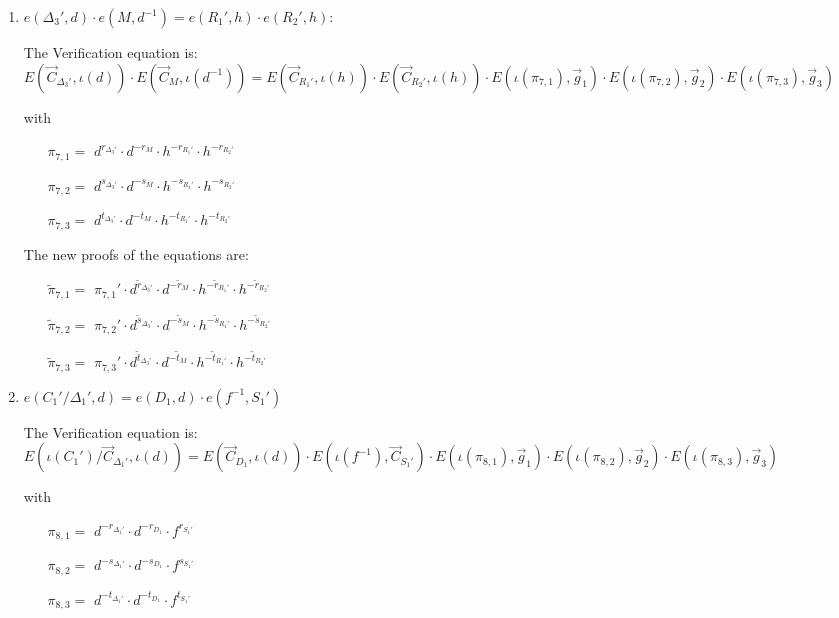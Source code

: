 \begin{description}
\begin{enumerate}
  \item $e(\boxed{\Delta_3'},d) \cdot e(\boxed{M}, d^{-1})= e(\boxed{R_1'}, h) \cdot e(\boxed{R_2'}, h)$:
    
    The Verification equation is:  $E(\vec{C}_{\Delta_3'}, \iota(d)) \cdot E(\vec{C}_M, \iota(d^{-1}))= E(\vec{C}_{R_1'}, \iota(h)) \cdot E(\vec{C}_{R_2'}, \iota(h)) \cdot E(\iota(\pi_{7,1}), \vec{g}_1)\cdot E(\iota(\pi_{7,2}), \vec{g}_2)\cdot E(\iota(\pi_{7,3}), \vec{g}_3)$
    
    with
    \begin{itemize}
    \item[$\pi_{7,1} = $] $d^{r_{\Delta_3'}} \cdot d^{-r_M} \cdot h^{-r_{R_1'}} \cdot h^{-r_{R_2'}}$
    \item[$\pi_{7,2} = $] $d^{s_{\Delta_3'}} \cdot d^{-s_M} \cdot h^{-s_{R_1'}} \cdot h^{-s_{R_2'}}$
    \item[$\pi_{7,3} = $] $d^{t_{\Delta_3'}} \cdot d^{-t_M} \cdot h^{-t_{R_1'}} \cdot h^{-t_{R_2'}}$
    \end{itemize}   

    The new proofs of the equations are:
    \begin{itemize}
    \item[$\tilde{\pi}_{7,1} = $] $\pi_{7,1}' \cdot d^{\tilde{r}_{\Delta_3'}} \cdot d^{-\tilde{r}_M} \cdot h^{-\tilde{r}_{R_1'}} \cdot h^{-\tilde{r}_{R_2'}}$
    \item[$\tilde{\pi}_{7,2} = $] $\pi_{7,2}' \cdot d^{\tilde{s}_{\Delta_3'}} \cdot d^{-\tilde{s}_M} \cdot h^{-\tilde{s}_{R_1'}} \cdot h^{-\tilde{s}_{R_2'}}$
    \item[$\tilde{\pi}_{7,3} = $] $\pi_{7,3}' \cdot d^{\tilde{t}_{\Delta_3'}} \cdot d^{-\tilde{t}_M} \cdot h^{-\tilde{t}_{R_1'}} \cdot h^{-\tilde{t}_{R_2'}}$
    \end{itemize}

    
  \item $e(C_1'/\boxed{\Delta_1'}, d) = e (\boxed{D_1},d) \cdot e(f^{-1}, \boxed{S_1'})$

    The Verification equation is: $ E(\iota(C_1')/\vec{C}_{\Delta_1'}, \iota(d)) = E(\vec{C}_{D_1},\iota(d)) \cdot E(\iota(f^{-1}), \vec{C}_{S_1'})\cdot E(\iota(\pi_{8,1}), \vec{g}_1)\cdot E(\iota(\pi_{8,2}), \vec{g}_2)\cdot E(\iota(\pi_{8,3}), \vec{g}_3)$

    with
    \begin{itemize}
    \item[$\pi_{8,1} = $] $d^{-r_{\Delta_1'}} \cdot d^{-r_{D_1}} \cdot f^{r_{S_1'}}$
    \item[$\pi_{8,2} = $] $d^{-s_{\Delta_1'}} \cdot d^{-s_{D_1}} \cdot f^{s_{S_1'}}$
    \item[$\pi_{8,3} = $] $d^{-t_{\Delta_1'}} \cdot d^{-t_{D_1}} \cdot f^{t_{S_1'}}$
    \end{itemize}


\end{enumerate}
\end{description}
